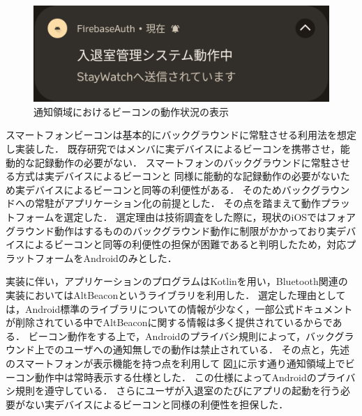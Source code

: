 \begin{figure}[tbh]
  \centering
  \includegraphics[width=14cm]{image/AppNofication.png}
  \caption{通知領域におけるビーコンの動作状況の表示}
  \label{fig:AppNofication}
\end{figure}


スマートフォンビーコンは基本的にバックグラウンドに常駐させる利用法を想定し実装した．
既存研究ではメンバに実デバイスによるビーコンを携帯させ，能動的な記録動作の必要がない．
スマートフォンのバックグラウンドに常駐させる方式は実デバイスによるビーコンと
同様に能動的な記録動作の必要がないため実デバイスによるビーコンと同等の利便性がある．
そのためバックグラウンドへの常駐がアプリケーション化の前提とした．
その点を踏まえて動作プラットフォームを選定した．
選定理由は技術調査をした際に，現状のiOSではフォアグラウンド動作はするもののバックグラウンド動作に制限がかかっており実デバイスによるビーコンと同等の利便性の担保が困難であると判明したため，対応プラットフォームをAndroidのみとした．

実装に伴い，アプリケーションのプログラムはKotlinを用い，Bluetooth関連の実装においてはAltBeaconというライブラリを利用した．
選定した理由としては，Android標準のライブラリについての情報が少なく，一部公式ドキュメントが削除されている中でAltBeaconに関する情報は多く提供されているからである．
ビーコン動作をする上で，Androidのプライバシ規則によって，バックグラウンド上でのユーザへの通知無しでの動作は禁止されている．
その点と，先述のスマートフォンが表示機能を持つ点を利用して 図\ref{fig:AppNofication}に示す通り通知領域上でビーコン動作中は常時表示する仕様とした．
この仕様によってAndroidのプライバシ規則を遵守している．
さらにユーザが入退室のたびにアプリの起動を行う必要がない実デバイスによるビーコンと同様の利便性を担保した．



